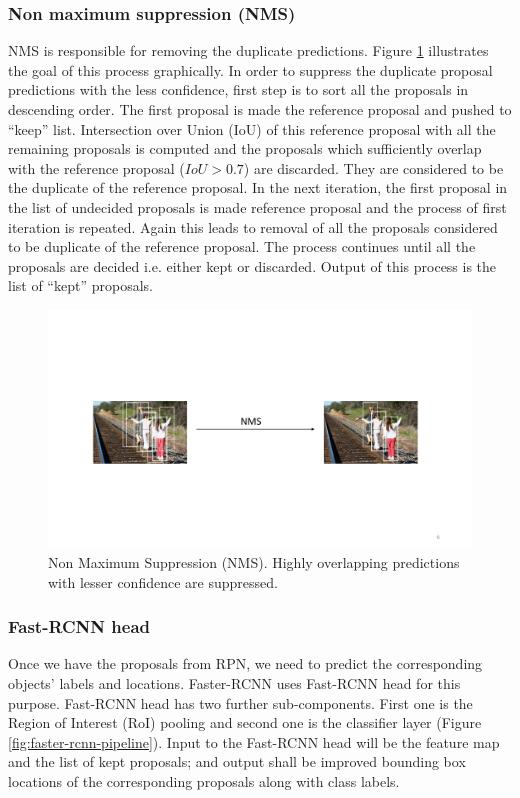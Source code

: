 \subsubsection{Non maximum suppression (NMS)}
NMS is responsible for removing the duplicate predictions. Figure \ref{fig:nms} illustrates the goal of this process graphically. In order to suppress the duplicate proposal predictions with the less confidence, first step is to sort all the proposals in descending order. The first proposal is made  the reference proposal and pushed to ``keep'' list. Intersection over Union (IoU) of this reference proposal with all the remaining proposals is computed and the proposals which sufficiently overlap with the reference proposal ($IoU > 0.7$) are discarded. They are considered to be the duplicate of the reference proposal. In the next iteration, the first proposal in the list of undecided proposals is made reference proposal and the process of first iteration is repeated. Again this leads to removal of all the proposals considered to be duplicate of the reference proposal. The process continues until all the proposals are decided i.e. either kept or discarded. Output of this process is the list of ``kept'' proposals. 

\begin{figure}
    \centering
    \includegraphics[width=\linewidth,trim={0 150 0 150},clip]{images/nms}
    \caption[Non Maximum Suppression (NMS)]{Non Maximum Suppression (NMS). Highly overlapping predictions with lesser confidence are suppressed.}
    \label{fig:nms}
\end{figure}

\vspace{5pt}
\subsubsection{Fast-RCNN head}
Once we have the proposals from RPN, we need to predict the corresponding objects' labels and locations. Faster-RCNN uses Fast-RCNN head\cite{ref_fastrcnn} for this purpose. Fast-RCNN head has two further sub-components. First one is the Region of Interest (RoI) pooling and second one is the classifier layer (Figure \ref{fig:faster-rcnn-pipeline}). Input to the Fast-RCNN head will be the feature map and the list of kept proposals; and output shall be improved bounding box locations of the corresponding proposals along with class labels. 

